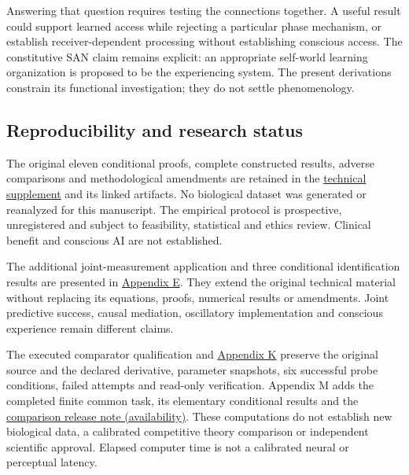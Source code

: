 \documentclass[
  american,
  11pt,
  letterpaper,
]{article}
\begin{document}
Answering that question requires testing the connections together. A useful result could support learned access while rejecting a particular phase mechanism, or establish receiver-dependent processing without establishing conscious access. The constitutive SAN claim remains explicit: an appropriate self-world learning organization is proposed to be the experiencing system. The present derivations constrain its functional investigation; they do not settle phenomenology.

\subsection{Reproducibility and research status}\label{reproducibility-and-research-status}

The original eleven conditional proofs, complete constructed results, adverse comparisons and methodological amendments are retained in the \href{https://zenodo.org/records/23509961/files/Learning-to-Feel-Technical-Supplement-v1.1.pdf}{technical supplement} and its linked artifacts. No biological dataset was generated or reanalyzed for this manuscript. The empirical protocol is prospective, unregistered and subject to feasibility, statistical and ethics review. Clinical benefit and conscious AI are not established.

The additional joint-measurement application and three conditional identification results are presented in \href{https://zenodo.org/records/23509961/files/Learning-to-Feel-Technical-Supplement-v1.1.pdf\#appendix-e}{Appendix E}. They extend the original technical material without replacing its equations, proofs, numerical results or amendments. Joint predictive success, causal mediation, oscillatory implementation and conscious experience remain different claims.

The executed comparator qualification and \href{https://zenodo.org/records/23509961/files/Learning-to-Feel-Technical-Supplement-v1.1.pdf\#appendix-k}{Appendix K} preserve the original source and the declared derivative, parameter snapshots, six successful probe conditions, failed attempts and read-only verification. Appendix M adds the completed finite common task, its elementary conditional results and the \href{https://github.com/v5ma/v5ma.github.io/blob/master/papers/companions/learning-to-feel-v1.0/ARTIFACT-AVAILABILITY.md\#artifact-36}{comparison release note (availability)}. These computations do not establish new biological data, a calibrated competitive theory comparison or independent scientific approval. Elapsed computer time is not a calibrated neural or perceptual latency.
\end{document}
